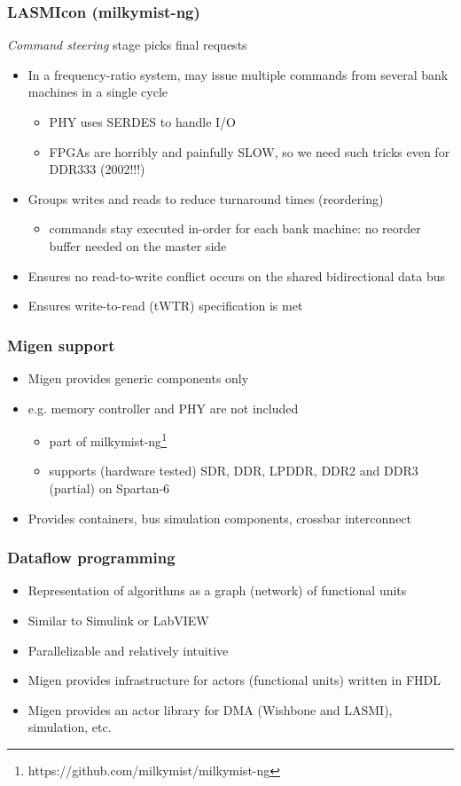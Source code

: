 \documentclass[serif,mathserif]{beamer}
\begin{document}
\begin{frame}
\frametitle{LASMIcon (milkymist-ng)}
\textit{Command steering} stage picks final requests
\begin{itemize}
\item In a frequency-ratio system, may issue multiple commands from several bank machines in a single cycle
\begin{itemize}
\item PHY uses SERDES to handle I/O
\item FPGAs are horribly and painfully SLOW, so we need such tricks even for DDR333 (2002!!!)
\end{itemize}
\item Groups writes and reads to reduce turnaround times (reordering)
\begin{itemize}
\item commands stay executed in-order for each bank machine: no reorder buffer needed on the master side
\end{itemize}
\item Ensures no read-to-write conflict occurs on the shared bidirectional data bus
\item Ensures write-to-read (tWTR) specification is met
\end{itemize}
\end{frame}

\begin{frame}
\frametitle{Migen support}
\begin{itemize}
\item Migen provides generic components only
\item e.g. memory controller and PHY are not included
\begin{itemize}
\item part of milkymist-ng\footnote{https://github.com/milkymist/milkymist-ng}
\item supports (hardware tested) SDR, DDR, LPDDR, DDR2 and DDR3 (partial) on Spartan-6
\end{itemize}
\item Provides containers, bus simulation components, crossbar interconnect
\end{itemize}
\end{frame}

\begin{frame}
\frametitle{Dataflow programming}
\begin{itemize}
\item Representation of algorithms as a graph (network) of functional units
\item Similar to Simulink or LabVIEW
\item Parallelizable and relatively intuitive
\item Migen provides infrastructure for actors (functional units) written in FHDL
\item Migen provides an actor library for DMA (Wishbone and LASMI), simulation, etc.
\end{itemize}
\end{frame}
\end{document}
